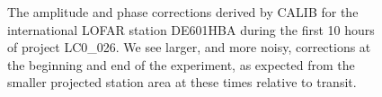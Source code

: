 \begin{figure}[htbp]
\centering
{}
\caption{
The amplitude and phase corrections derived by CALIB for the international LOFAR station DE601HBA during the first 10 hours of project LC0\_026. 
We see larger, and more noisy, corrections at the beginning and end of the experiment, as expected from the smaller
projected station area at these times relative to transit. 
\label{fig:ampcal}
}
\end{figure}
    
